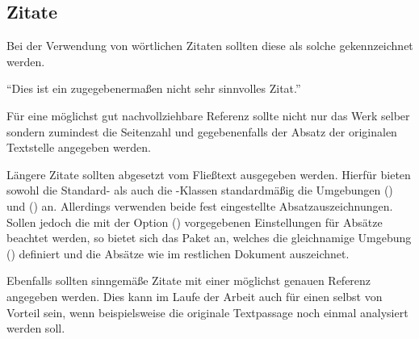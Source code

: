 \documentclass[%
  english,ngerman,%
  cdgeometry=no,DIV=12,%
  automark,%
  listof=toc,%
]{tudscrartcl}
\begin{document}
\begin{refsection}
\begin{Trunk+}
\section{Zitate}
Bei der Verwendung von wörtlichen Zitaten sollten diese als solche 
gekennzeichnet werden.
\end{Trunk+}
\begin{Trunk*}
\enquote{Dies ist ein zugegebenermaßen nicht sehr sinnvolles Zitat.}
\cite[58]{hanisch19}
\end{Trunk*}
\begin{Trunk+}
Für eine möglichst gut nachvollziehbare Referenz sollte nicht nur 
das Werk selber sondern zumindest die Seitenzahl und gegebenenfalls 
der Absatz der originalen Textstelle angegeben werden. 
\end{Trunk+}
%
Längere Zitate sollten abgesetzt vom Fließtext ausgegeben werden. Hierfür 
bieten sowohl die Standard- als auch die \KOMAScript-Klassen standardmäßig 
die Umgebungen () und 
() an. Allerdings verwenden beide 
fest eingestellte Absatzauszeichnungen. Sollen jedoch die mit der Option 
() vorgegebenen Einstellungen für Absätze 
beachtet werden, so bietet sich das Paket  an, welches die 
gleichnamige Umgebung () definiert und 
die Absätze wie im restlichen Dokument auszeichnet.
%
\begin{Preamble}
\usepackage{quoting}

\end{Preamble}
%
\begin{Trunk*}
\end{Trunk*}
\begin{Trunk+}
Ebenfalls sollten sinngemäße Zitate mit einer möglichst genauen Referenz 
angegeben werden. Dies kann im Laufe der Arbeit auch für einen selbst von 
Vorteil sein, wenn beispielsweise die originale Textpassage noch einmal 
analysiert werden soll.

\end{Trunk+}
\begin{quoting}[rightmargin=0pt]
\makeatletter
\let\markboth\@gobbletwo
\let\markright\@gobble
\makeatother
\printbibliography
\end{quoting}
\end{refsection}
\end{document}
